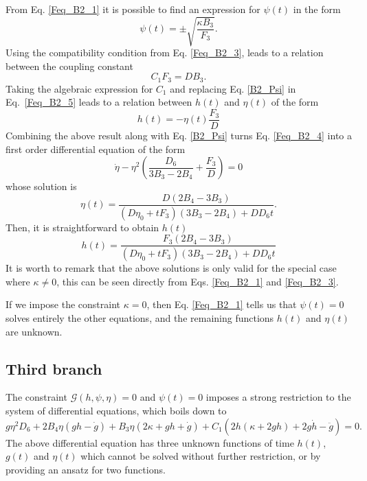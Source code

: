 \documentclass[epj]{svjour}
\begin{document}
From Eq. \eqref{Feq_B2_1} it is possible to find an expression for $\psi(t)$ in the form
\begin{equation}
	\label{B2_Psi}
    \psi(t) = \pm \sqrt{\frac{\kappa B_3}{F_3}} .
\end{equation}
Using the compatibility condition from Eq. \eqref{Feq_B2_3}, leads to a relation between
the coupling constant
\begin{equation}
 C_1 F_3 = D B_3.
\end{equation}
Taking the algebraic expression for $C_1$ and replacing Eq. \eqref{B2_Psi} in Eq.~\eqref{Feq_B2_5} leads to a relation between $h(t)$ and $\eta(t)$ of the form
\begin{equation}
    h(t) = - \eta(t)\frac{F_3}{D}
\end{equation}
Combining the above result along with Eq. \eqref{B2_Psi} turns Eq. \eqref{Feq_B2_4} into a first order differential equation of the form
\begin{equation}
 \dot{\eta} - \eta^2\left(\frac{D_6}{3B_3 - 2B_4} + \frac{F_3}{D}\right) = 0
\end{equation}
whose solution is
\begin{equation}
    \eta(t) = \frac{D\left(2B_4 - 3B_3\right)}{\left(D \eta_0 + tF_3\right)\left(3B_3 - 2B_4\right) + DD_6 t}.
\end{equation}
Then, it is straightforward to obtain $h(t)$ 
\begin{equation}
    h(t) = \frac{F_3\left(2B_4 - 3B_3\right)}{\left(D \eta_0 + tF_3\right)\left(3B_3 - 2B_4\right) + DD_6 t}
\end{equation}
It is worth to remark that the above solutions is only valid for the special case 
where $\kappa \neq 0$, this can be seen directly from Eqs. \eqref{Feq_B2_1} and \eqref{Feq_B2_3}.

If we impose the constraint $\kappa = 0$, then Eq. \eqref{Feq_B2_1} tells us that $\psi(t) = 0$ solves entirely the other
equations, and the remaining functions $h(t)$ and $\eta(t)$ are unknown.

\subsection{Third branch}

The constraint $\mathcal{G}(h,\psi,\eta) = 0$ and $\psi(t)=0$ imposes a strong restriction to the system of differential equations, which boils down to 
\begin{dmath}
    g\eta^2D_6 + 2B_4\eta \left(gh - \dot{g}\right) + B_3\eta\left(2\kappa + gh + \dot{g}\right) + 
    C_1\left(2h\left(\kappa + 2gh\right) + 2g\dot{h} - \ddot{g}\right) = 0.
\end{dmath}
The above differential equation has three unknown functions of time $h(t)$, $g(t)$ and $\eta(t)$ which cannot be solved without 
further restriction, or by providing an ansatz for two functions.
\end{document}
